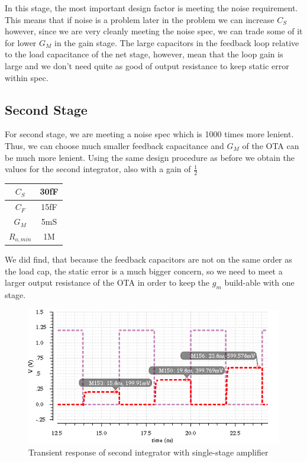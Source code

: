 \documentclass[conference]{IEEEtran}
\begin{document}
In this stage, the most important design factor is meeting the noise requirement. This means that if noise is a problem later in the problem we can increase $C_S$ however, since we are very cleanly meeting the noise spec, we can trade some of it for lower $G_M$ in the gain stage. The large capacitors in the feedback loop relative to the load capacitance of the net stage, however, mean that the loop gain is large and we don't need quite as good of output resistance to keep static error within spec.

\subsection{Second Stage}

For second stage, we are meeting a noise spec which is 1000 times more lenient. Thus, we can choose much smaller feedback capacitance and $G_M$ of the OTA can be much more lenient. Using the same design procedure as before we obtain the values for the second integrator, also with a gain of $\frac{1}{2}$

\begin{center}
\begin{tabular}{|c|c|} 
\hline
$C_S$ & 30fF \\
\hline
$C_F$ & 15fF \\
\hline
$G_M$ & 5mS \\
\hline
$R_{o,min}$ & 1M \\
\hline
\end{tabular}
\end{center}


We did find, that because the feedback capacitors are not on the same order as the load cap, the static error is a much bigger concern, so we need to meet a larger output resistance of the OTA in order to keep the $g_m$ build-able with one stage.

\begin{figure}[h]
\centering
\includegraphics[width=\linewidth]{img/stage2-tran}
\caption{Transient response of second integrator with single-stage amplifier}
\label{stage2-tran}
\end{figure}
\end{document}
